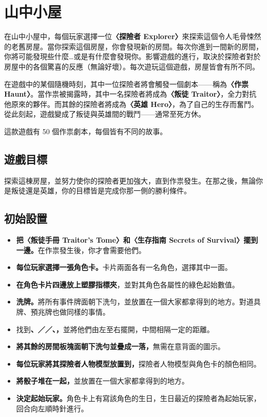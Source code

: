 
\section{山中小屋} \label{sec:intro}

在山中小屋中，每個玩家選擇一位\textbf{〈探險者 Explorer〉}來探索這個令人毛骨悚然的老舊房屋。當你探索這個房屋，你會發現新的房間。每次你進到一間新的房間，你將可能發現些什麼…或是有什麼會發現你。影響遊戲的進行，取決於探險者對於房屋中的各個驚喜的反應（無論好壞）。每次遊玩這個遊戲，房屋皆會有所不同。

在遊戲中的某個隨機時刻，其中一位探險者將會觸發一個劇本——稱為\textbf{〈作祟 Haunt〉}。當作祟被揭露時，其中一名探險者將成為\textbf{〈叛徒 Traitor〉}，全力對抗他原來的夥伴。而其餘的探險者將成為\textbf{〈英雄 Hero〉}，為了自己的生存而奮鬥。從此刻起，遊戲變成了叛徒與英雄間的戰鬥——通常至死方休。

這款遊戲有 50 個作祟劇本，每個皆有不同的故事。


\subsection{遊戲目標}

探索這棟房屋，並努力使你的探險者更加強大，直到作祟發生。在那之後，無論你是叛徒還是英雄，你的目標皆是完成你那一側的勝利條件。


\subsection{初始設置}

\begin{itemize}
	\item \textbf{把〈叛徒手冊 Traitor's Tome〉和〈生存指南 Secrets of Survival〉擺到一邊。}在作祟發生後，你才會需要他們。
	\item \textbf{每位玩家選擇一張角色卡。}卡片兩面各有一名角色，選擇其中一面。
	\item \textbf{在角色卡片四邊放上塑膠指標夾}，並對其角色各屬性的綠色起始數值。
	\item \textbf{洗牌。}將所有事件牌面朝下洗勻，並放置在一個大家都拿得到的地方。對道具牌、預兆牌也做同樣的事情。
	\item 找到\textbf{、／／、，}並將他們由左至右擺開，中間相隔一定的距離。
	\item \textbf{將其餘的房間板塊面朝下洗勻並疊成一落，}無需在意背面的圖示。
	\item \textbf{每位玩家將其探險者人物模型放置到，}探險者人物模型與角色卡的顏色相同。
	\item \textbf{將骰子堆在一起，}並放置在一個大家都拿得到的地方。
	\item \textbf{決定起始玩家。}角色卡上有寫該角色的生日，生日最近的探險者為起始玩家，回合向左順時針進行。
\end{itemize}
